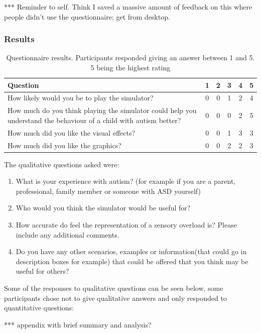 \documentclass[11pt]{report}
\begin{document}
*** Reminder to self. Think I saved a massive amount of feedback on this where people didn't use the questionnaire; get from desktop.

\subsubsection{Results}

\begin{table}[H]
\caption{Questionnaire results. Participants responded giving an answer between 1 and 5. 5 being the highest rating}
\begin{tabular}{| p{9cm} | c c c c c |}
\hline
\textbf{Question} & 1 & 2 & 3 & 4 & 5 \\
\hline
How likely would you be to play the simulator? & 0 & 0 & 1 & 2 & 4 \\
\hline
How much do you think playing the simulator could help you understand the behaviour of a child with autism better? & 0 & 0 & 0 & 2 & 5 \\
\hline
How much did you like the visual effects? & 0 & 0 & 1 & 3 & 3 \\
\hline
How much did you like the graphics? & 0 & 0 & 2 & 2 & 3 \\ 
\hline
\end{tabular}
\end{table}

The qualitative questions asked were:
\begin{enumerate}
\item What is your experience with autism? (for example if you are a parent, professional, family member or someone with ASD yourself)
\item Who would you think the simulator would be useful for?
\item How accurate do feel the representation of a sensory overload is? Please include any additional comments.
\item Do you have any other scenarios, examples or information(that could go in description boxes for example) that could be offered that you think may be useful for others?
\end{enumerate}

Some of the responses to qualitative questions can be seen below, some participants chose not to give qualitative answers and only responded to quantitative questions:

*** appendix with brief summary and analysis?
\end{document}
